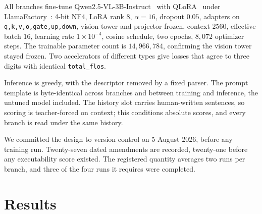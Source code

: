 \documentclass[conference]{IEEEtran}
\begin{document}
All branches fine-tune Qwen2.5-VL-3B-Instruct~\cite{qwen25vl} with QLoRA~\cite{lora,qlora} under
LlamaFactory~\cite{llamafactory}: 4-bit NF4, LoRA rank $8$, $\alpha = 16$, dropout $0.05$,
adapters on \texttt{q,k,v,o,gate,up,down}, vision tower and projector frozen, context $2560$,
effective batch $16$, learning rate $1\times10^{-4}$, cosine schedule, two epochs, $8{,}072$
optimizer steps. The trainable parameter count is $14{,}966{,}784$, confirming the vision tower
stayed frozen. Two accelerators of different types give losses that agree to three digits with
identical \texttt{total\_flos}.

Inference is greedy, with the descriptor removed by a fixed parser. The prompt template is
byte-identical across branches and between training and inference, the untuned model included. The
history slot carries human-written sentences, so scoring is teacher-forced on context; this
conditions absolute scores, and every branch is read under the same history.

We committed the design to version control on 5 August 2026, before any training run. Twenty-seven
dated amendments are recorded, twenty-one before any executability score existed. The registered
quantity averages two runs per branch, and three of the four runs it requires were
completed.

\section{Results}
\label{sec:results}
\end{document}
